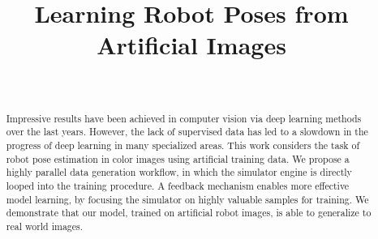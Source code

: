 \documentclass[conference]{IEEEtran}
\begin{document}
\title{Learning Robot Poses from Artificial Images\\
}

\newif\iffinalcopy


\iffinalcopy

    \author{
        \IEEEauthorblockN{
            Christoph Heindl\IEEEauthorrefmark{1}, 
            Sebastian Zambal\IEEEauthorrefmark{1}, 
            Markus Ikeda\IEEEauthorrefmark{1}, 
            Andreas Pichler\IEEEauthorrefmark{1}, and 
            Josef Scharinger\IEEEauthorrefmark{2}
        }
        \\
        \IEEEauthorblockA{
            \IEEEauthorrefmark{1}\textit{PROFACTOR GmbH} \\ 4407 Steyr, Austria\\ \texttt{firstname.lastname@profactor.at}
        }
        \\
        \IEEEauthorblockA{
            \IEEEauthorrefmark{2}\textit{Institute of Computational Perception} \\ Johannes Kepler University \\ 4040 Linz, Austria\\ \texttt{josef.scharinger@jku.at}
        }
    }

\else

    \author{
        \\
    }

\fi


\maketitle

\begin{abstract}
    Impressive results have been achieved in computer vision via deep learning methods over the last years. However, the lack of supervised data has led to a slowdown in the progress of deep learning in many specialized areas. This work considers the task of robot pose estimation in color images using artificial training data. We propose a highly parallel data generation workflow, in which the simulator engine is directly looped into the training procedure. A feedback mechanism enables more effective model learning, by focusing the simulator on highly valuable samples for training. We demonstrate that our model, trained on artificial robot images, is able to generalize to real world images. 
\end{abstract}
\end{document}
